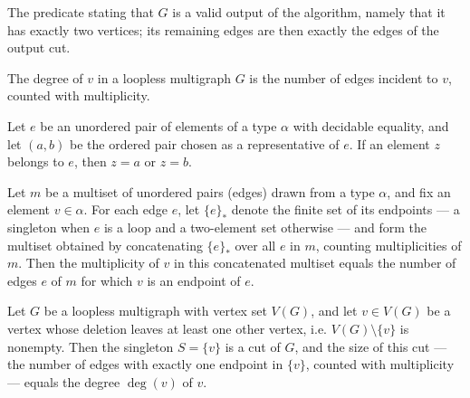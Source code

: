 \begin{definition}
\label{KargerOutput}
\leanok
{}
The predicate stating that $G$ is a valid output of the algorithm, namely that it has
exactly two vertices; its remaining edges are then exactly the edges of the output cut.
\end{definition}

\begin{definition}
\label{Multigraph.degree}
\leanok
{}
The degree of $v$ in a loopless multigraph $G$ is the number of edges incident to $v$,
counted with multiplicity.
\end{definition}

\begin{lemma}
\label{eq_out_or_eq_out_of_mem}
\leanok
{}
Let $e$ be an unordered pair of elements of a type $\alpha$ with decidable equality, and
let $(a, b)$ be the ordered pair chosen as a representative of $e$. If an element $z$
belongs to $e$, then $z = a$ or $z = b$.
\end{lemma}

\begin{lemma}
\label{count_bind_endpoints_eq_card_filter}
\leanok
{}
Let $m$ be a multiset of unordered pairs (edges) drawn from a type $\alpha$, and fix an
element $v \in \alpha$. For each edge $e$, let $\{e\}_\ast$ denote the finite set of its
endpoints — a singleton when $e$ is a loop and a two-element set otherwise — and form
the multiset obtained by concatenating $\{e\}_\ast$ over all $e$ in $m$, counting
multiplicities of $m$. Then the multiplicity of $v$ in this concatenated multiset equals
the number of edges $e$ of $m$ for which $v$ is an endpoint of $e$.
\end{lemma}

\begin{lemma}
\label{singleton_cut_size_eq_degree}
\leanok
{}
Let $G$ be a loopless multigraph with vertex set $V(G)$, and let $v \in V(G)$ be a
vertex whose deletion leaves at least one other vertex, i.e. $V(G) \setminus \{v\}$ is
nonempty. Then the singleton $S = \{v\}$ is a cut of $G$, and the size of this cut — the
number of edges with exactly one endpoint in $\{v\}$, counted with multiplicity — equals
the degree $\deg(v)$ of $v$.
\end{lemma}

